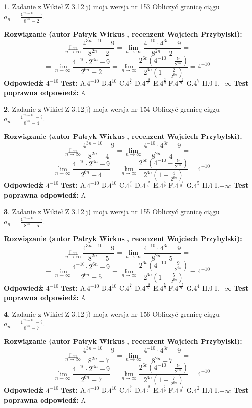 \documentclass[12pt, a4paper]{article}
\theoremstyle{definition} %
\newtheorem{zad}{}
\newcommand{\zadStart}[1]{\begin{zad}#1\newline}
\newcommand{\zadStop}{\end{zad}}
\newcommand{\rozwStart}[2]{\noindent \textbf{Rozwiązanie (autor #1 , recenzent #2): }\newline}
\newcommand{\rozwStop}{\newline}
\newcommand{\odpStart}{\noindent \textbf{Odpowiedź:}\newline}
\newcommand{\odpStop}{\newline}
\newcommand{\testStart}{\noindent \textbf{Test:}\newline}
\newcommand{\testStop}{\newline}
\newcommand{\kluczStart}{\noindent \textbf{Test poprawna odpowiedź:}\newline}
\newcommand{\kluczStop}{\newline}
\begin{document}
\zadStart{Zadanie z Wikieł Z 3.12 j) moja wersja nr 153}
Obliczyć granicę ciągu $a_{n}=\frac{4^{3n-10}-9}{8^{2n}-2}$.
\zadStop
\rozwStart{Patryk Wirkus}{Wojciech Przybylski}
$$\lim\limits_{n\to\infty}\frac{4^{3n-10}-9}{8^{2n}-2}= \lim\limits_{n\to\infty}\frac{4^{-10} \cdot 4^{3n}-9}{8^{2n}-2}=$$
$$= \lim\limits_{n\to\infty}\frac{4^{-10} \cdot 2^{6n}-9}{2^{6n}-2}= \lim\limits_{n\to\infty}\frac{2^{6n}(4^{-10} - \frac{9}{2^{6n}})}{2^{6n}(1-\frac{2}{2^{6n}})}= 4^{-10}$$
\rozwStop
\odpStart
$4^{-10}$
\odpStop
\testStart
A.$4^{-10}$
B.$4^{10}$
C.$4^{\frac{9}{2}}$
D.$4^{\frac{-9}{2}}$
E.$4^{\frac{2}{9}}$
F.$4^{\frac{-2}{9}}$
G.$4^{7}$
H.$0$
I.$-\infty$
\testStop
\kluczStart
A
\kluczStop



\zadStart{Zadanie z Wikieł Z 3.12 j) moja wersja nr 154}
Obliczyć granicę ciągu $a_{n}=\frac{4^{3n-10}-9}{8^{2n}-4}$.
\zadStop
\rozwStart{Patryk Wirkus}{Wojciech Przybylski}
$$\lim\limits_{n\to\infty}\frac{4^{3n-10}-9}{8^{2n}-4}= \lim\limits_{n\to\infty}\frac{4^{-10} \cdot 4^{3n}-9}{8^{2n}-4}=$$
$$= \lim\limits_{n\to\infty}\frac{4^{-10} \cdot 2^{6n}-9}{2^{6n}-4}= \lim\limits_{n\to\infty}\frac{2^{6n}(4^{-10} - \frac{9}{2^{6n}})}{2^{6n}(1-\frac{4}{2^{6n}})}= 4^{-10}$$
\rozwStop
\odpStart
$4^{-10}$
\odpStop
\testStart
A.$4^{-10}$
B.$4^{10}$
C.$4^{\frac{9}{4}}$
D.$4^{\frac{-9}{4}}$
E.$4^{\frac{4}{9}}$
F.$4^{\frac{-4}{9}}$
G.$4^{5}$
H.$0$
I.$-\infty$
\testStop
\kluczStart
A
\kluczStop



\zadStart{Zadanie z Wikieł Z 3.12 j) moja wersja nr 155}
Obliczyć granicę ciągu $a_{n}=\frac{4^{3n-10}-9}{8^{2n}-5}$.
\zadStop
\rozwStart{Patryk Wirkus}{Wojciech Przybylski}
$$\lim\limits_{n\to\infty}\frac{4^{3n-10}-9}{8^{2n}-5}= \lim\limits_{n\to\infty}\frac{4^{-10} \cdot 4^{3n}-9}{8^{2n}-5}=$$
$$= \lim\limits_{n\to\infty}\frac{4^{-10} \cdot 2^{6n}-9}{2^{6n}-5}= \lim\limits_{n\to\infty}\frac{2^{6n}(4^{-10} - \frac{9}{2^{6n}})}{2^{6n}(1-\frac{5}{2^{6n}})}= 4^{-10}$$
\rozwStop
\odpStart
$4^{-10}$
\odpStop
\testStart
A.$4^{-10}$
B.$4^{10}$
C.$4^{\frac{9}{5}}$
D.$4^{\frac{-9}{5}}$
E.$4^{\frac{5}{9}}$
F.$4^{\frac{-5}{9}}$
G.$4^{4}$
H.$0$
I.$-\infty$
\testStop
\kluczStart
A
\kluczStop



\zadStart{Zadanie z Wikieł Z 3.12 j) moja wersja nr 156}
Obliczyć granicę ciągu $a_{n}=\frac{4^{3n-10}-9}{8^{2n}-7}$.
\zadStop
\rozwStart{Patryk Wirkus}{Wojciech Przybylski}
$$\lim\limits_{n\to\infty}\frac{4^{3n-10}-9}{8^{2n}-7}= \lim\limits_{n\to\infty}\frac{4^{-10} \cdot 4^{3n}-9}{8^{2n}-7}=$$
$$= \lim\limits_{n\to\infty}\frac{4^{-10} \cdot 2^{6n}-9}{2^{6n}-7}= \lim\limits_{n\to\infty}\frac{2^{6n}(4^{-10} - \frac{9}{2^{6n}})}{2^{6n}(1-\frac{7}{2^{6n}})}= 4^{-10}$$
\rozwStop
\odpStart
$4^{-10}$
\odpStop
\testStart
A.$4^{-10}$
B.$4^{10}$
C.$4^{\frac{9}{7}}$
D.$4^{\frac{-9}{7}}$
E.$4^{\frac{7}{9}}$
F.$4^{\frac{-7}{9}}$
G.$4^{2}$
H.$0$
I.$-\infty$
\testStop
\kluczStart
A
\kluczStop
\end{document}
